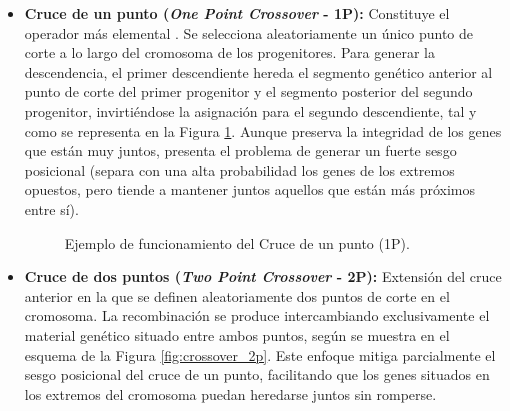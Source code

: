 \begin{itemize}
    \item \textbf{Cruce de un punto (\textit{One Point Crossover} - 1P):} Constituye el operador más elemental \cite{holland1975adaptation}. Se selecciona aleatoriamente un único punto de corte a lo largo del cromosoma de los progenitores. Para generar la descendencia, el primer descendiente hereda el segmento genético anterior al punto de corte del primer progenitor y el segmento posterior del segundo progenitor, invirtiéndose la asignación para el segundo descendiente, tal y como se representa en la Figura \ref{fig:crossover_1p}. Aunque preserva la integridad de los genes que están muy juntos, presenta el problema de generar un fuerte sesgo posicional (separa con una alta probabilidad los genes de los extremos opuestos, pero tiende a mantener juntos aquellos que están más próximos entre sí).

\begin{figure}[H]
\centering
{}
\caption{Ejemplo de funcionamiento del Cruce de un punto (1P).}
\label{fig:crossover_1p}
\end{figure}

    \item \textbf{Cruce de dos puntos (\textit{Two Point Crossover} - 2P):} Extensión del cruce anterior \cite{dejong1975analysis} en la que se definen aleatoriamente dos puntos de corte en el cromosoma. La recombinación se produce intercambiando exclusivamente el material genético situado entre ambos puntos, según se muestra en el esquema de la Figura \ref{fig:crossover_2p}. Este enfoque mitiga parcialmente el sesgo posicional del cruce de un punto, facilitando que los genes situados en los extremos del cromosoma puedan heredarse juntos sin romperse.


\end{itemize}
